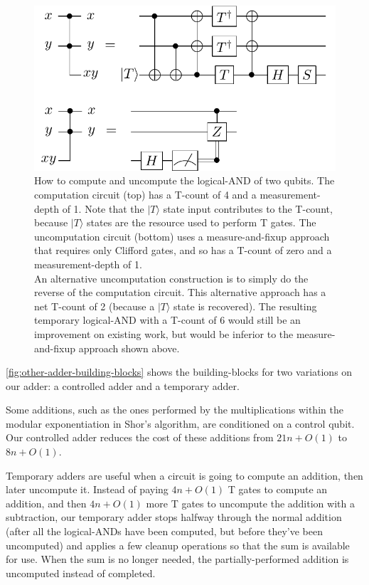 \documentclass[twocolumn]{quantumarticle-customized}
\begin{document}
\begin{figure}
  \includegraphics[width=\linewidth]{temporary-logical-and.pdf}
  \caption{
	How to compute and uncompute the logical-AND of two qubits.
	The computation circuit (top) has a T-count of 4 and a measurement-depth of 1.
	Note that the $|T\rangle$ state input contributes to the T-count, because $|T\rangle$ states are the resource used to perform T gates.
	The uncomputation circuit (bottom) uses a measure-and-fixup approach \cite{Jones2013} that requires only Clifford gates, and so has a T-count of zero and a measurement-depth of 1.
    \\
    An alternative uncomputation construction is to simply do the reverse of the computation circuit.
    This alternative approach has a net T-count of 2 (because a $|T\rangle$ state is recovered).
    The resulting temporary logical-AND with a T-count of 6 would still be an improvement on existing work, but would be inferior to the measure-and-fixup approach shown above.
  }
  \label{fig:temporary-logical-AND}
\end{figure}


\autoref{fig:other-adder-building-blocks} shows the building-blocks for two variations on our adder: a controlled adder and a temporary adder.

Some additions, such as the ones performed by the multiplications within the modular exponentiation in Shor's algorithm, are conditioned on a control qubit.
Our controlled adder reduces the cost of these additions from $21n + O(1)$ \cite{Coreas2017} to $8n + O(1)$.

Temporary adders are useful when a circuit is going to compute an addition, then later uncompute it.
Instead of paying $4n + O(1)$ T gates to compute an addition, and then $4n + O(1)$ more T gates to uncompute the addition with a subtraction, our temporary adder stops halfway through the normal addition (after all the logical-ANDs have been computed, but before they've been uncomputed) and applies a few cleanup operations so that the sum is available for use.
When the sum is no longer needed, the partially-performed addition is uncomputed instead of completed.
\end{document}
